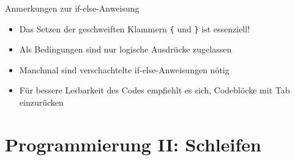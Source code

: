 \documentclass[aspectratio = 169]{chariteBeamer}
\begin{document}
\begin{frame}[fragile]{Anmerkungen zur if-else-Anweisung}
  \begin{itemize}
    \item Das Setzen der geschweiften Klammern \verb+{+ und \verb+}+ ist essenziell!
    \item Als Bedingungen sind nur logische Ausdrücke zugelassen 
    \item Manchmal sind verschachtelte if-else-Anweisungen nötig
    \item Für bessere Lesbarkeit des Codes empfiehlt es sich, Codeblöcke mit Tab einzurücken
  \end{itemize}
\end{frame}

\section{Programmierung II: Schleifen}
\end{document}
